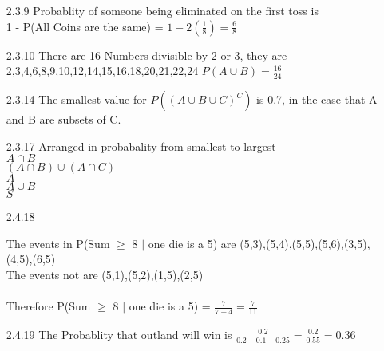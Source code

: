 \documentclass[11pt,fleqn]{article}
\begin{document}
\begin{enumerate}
\item[2.3.9]
Probablity of someone being eliminated on the first toss is \\
 1 - P(All Coins are the same) = $ 1 - 2(\frac{1}{8}) = \frac{6}{8}$

\item[2.3.10]
There are 16 Numbers divisible by 2 or 3, they are
2,3,4,6,8,9,10,12,14,15,16,18,20,21,22,24 $P(A \cup B ) = \frac{16}{24} $

\item[2.3.14]
The smallest value for $P( (A \cup B \cup C)^{C})$ is 0.7, in the case that A
and B are subsets of C. 

\item[2.3.17]
Arranged in probabality from smallest to largest\\
$A \cap B$ \\
$(A \cap B) \cup (A \cap C) $ \\
$A$ \\
$A \cup B$ \\
$S$
\item[2.4.18]
 
The events in P(Sum $\ge$ 8 $\mid$ one die is a 5) are
(5,3),(5,4),(5,5),(5,6),(3,5),(4,5),(6,5) \\
The events not are (5,1),(5,2),(1,5),(2,5) \\
\\
Therefore P(Sum $\ge$ 8 $\mid$ one die is a 5) = $\frac{7}{7+4} = \frac{7}{11} $
 
\item[2.4.19]
The Probablity that outland will win is $\frac{0.2}{0.2+0.1+0.25} =
\frac{0.2}{0.55} = 0.\bar{36}$
\end{enumerate}
\end{document}

